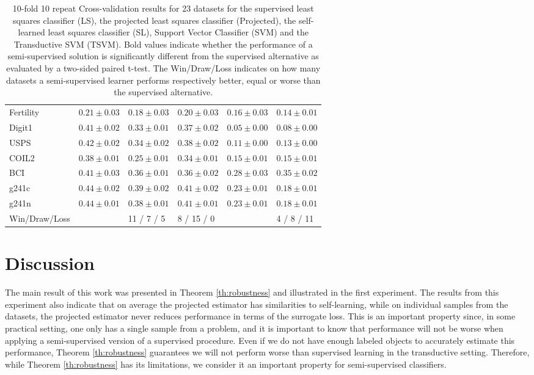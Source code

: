 \documentclass{article}
\begin{document}
\begin{table*}[t]
\begin{tabular}{|l|lll|ll|}
Fertility & $0.21 \pm 0.03$& $\mathbf{0.18 \pm 0.03} $& $0.20 \pm 0.03$& $0.16 \pm 0.03$& $\mathbf{0.14 \pm 0.01} $\\ 
Digit1 & $0.41 \pm 0.02$& $\mathbf{0.33 \pm 0.01} $& $\mathbf{0.37 \pm 0.02} $& $0.05 \pm 0.00$& $\mathbf{0.08 \pm 0.00} $\\ 
USPS & $0.42 \pm 0.02$& $\mathbf{0.34 \pm 0.02} $& $\mathbf{0.38 \pm 0.02} $& $0.11 \pm 0.00$& $\mathbf{0.13 \pm 0.00} $\\ 
COIL2 & $0.38 \pm 0.01$& $\mathbf{0.25 \pm 0.01} $& $\mathbf{0.34 \pm 0.01} $& $0.15 \pm 0.01$& $0.15 \pm 0.01$\\ 
BCI & $0.41 \pm 0.03$& $\mathbf{0.36 \pm 0.01} $& $\mathbf{0.36 \pm 0.02} $& $0.28 \pm 0.03$& $\mathbf{0.35 \pm 0.02} $\\ 
g241c & $0.44 \pm 0.02$& $\mathbf{0.39 \pm 0.02} $& $\mathbf{0.41 \pm 0.02} $& $0.23 \pm 0.01$& $\mathbf{0.18 \pm 0.01} $\\ 
g241n & $0.44 \pm 0.01$& $\mathbf{0.38 \pm 0.01} $& $\mathbf{0.41 \pm 0.01} $& $0.23 \pm 0.01$& $\mathbf{0.18 \pm 0.01} $\\
\hline
\hline
Win/Draw/Loss & & 11 / 7 / 5 & 8 / 15 / 0 & & 4 / 8 / 11\\ 
\hline
\end{tabular}

\caption{10-fold 10 repeat Cross-validation results for 23 datasets for the supervised least squares classifier (LS), the projected least squares classifier (Projected), the self-learned least squares classifier (SL), Support Vector Classifier (SVM) and the Transductive SVM (TSVM). Bold values indicate whether the performance of a semi-supervised solution is significantly different from the supervised alternative as evaluated by a two-sided paired t-test. The Win/Draw/Loss indicates on how many datasets a semi-supervised learner performs respectively better, equal or worse than the supervised alternative.}
\end{table*}

\section{Discussion}
The main result of this work was presented in Theorem \ref{th:robustness} and illustrated in the first experiment. The results from this experiment also indicate that on average the projected estimator has similarities to  self-learning, while on individual samples from the datasets, the projected estimator never reduces performance in terms of the surrogate loss. This is an important property since, in some practical setting, one only has a single sample from a problem, and it is important to know that performance will not be worse when applying a semi-supervised version of a supervised procedure. Even if we do not have enough labeled objects to accurately estimate this performance, Theorem \ref{th:robustness} guarantees we will not perform worse than supervised learning in the transductive setting. Therefore, while Theorem \ref{th:robustness} has its limitations, we consider it an important property for semi-supervised classifiers.
\end{document}
